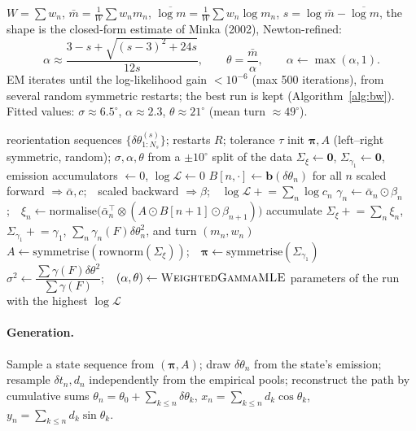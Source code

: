 \documentclass[11pt]{article}
\begin{document}
$W=\sum w_n$, $\bar m=\frac1W\sum w_nm_n$,
$\overline{\log m}=\frac1W\sum w_n\log m_n$, $s=\log\bar m-\overline{\log m}$, the
shape is the closed-form estimate of Minka (2002), Newton-refined:
\begin{equation}
\alpha\approx\frac{3-s+\sqrt{(s-3)^2+24s}}{12s},\qquad
\theta=\frac{\bar m}{\alpha},\qquad \alpha\leftarrow\max(\alpha,1).
\end{equation}
EM iterates until the log-likelihood gain $<10^{-6}$ (max 500 iterations), from
several random symmetric restarts; the best run is kept
(Algorithm~\ref{alg:bw}). Fitted values: $\sigma\approx6.5^\circ$,
$\alpha\approx2.3$, $\theta\approx21^\circ$ (mean turn $\approx49^\circ$).

\begin{algorithm}[h]
\caption{Baum-Welch for the symmetric 3-state HMM (spontaneous model)}
\label{alg:bw}
\begin{algorithmic}[1]
\Require reorientation sequences $\{\delta\theta^{(s)}_{1:N_s}\}$; restarts $R$; tolerance $\tau$
  \State init $\boldsymbol\pi,A$ (left--right symmetric, random); $\sigma,\alpha,\theta$ from a $\pm10^\circ$ split of the data
  \Repeat
    \State $\Sigma_\xi\gets\mathbf 0$, $\Sigma_{\gamma_1}\gets\mathbf 0$, emission accumulators $\gets 0$, $\log\mathcal L\gets 0$
      \State $B[n,\cdot]\gets\mathbf b(\delta\theta_n)$ for all $n$
      \State scaled forward $\Rightarrow\bar\alpha,c$;\ \ scaled backward $\Rightarrow\beta$;\ \ $\log\mathcal L\mathrel{+}=\sum_n\log c_n$
      \State $\gamma_n\gets\bar\alpha_n\odot\beta_n$;\ \ $\xi_n\gets\mathrm{normalise}\big(\bar\alpha_n^{\!\top}\!\otimes(A\odot B[n{+}1]\odot\beta_{n+1})\big)$
      \State accumulate $\Sigma_\xi\mathrel{+}=\sum_n\xi_n$, $\Sigma_{\gamma_1}\mathrel{+}=\gamma_1$, $\sum_n\gamma_n(F)\delta\theta_n^2$, and turn $(m_n,w_n)$
    \EndFor
    \State $A\gets\mathrm{symmetrise}(\mathrm{rownorm}(\Sigma_\xi))$;\ \ $\boldsymbol\pi\gets\mathrm{symmetrise}(\Sigma_{\gamma_1})$
    \State $\sigma^2\gets\dfrac{\sum\gamma(F)\delta\theta^2}{\sum\gamma(F)}$;\ \ $(\alpha,\theta)\gets\textsc{WeightedGammaMLE}$
\EndFor
\State \Return parameters of the run with the highest $\log\mathcal L$
\end{algorithmic}
\end{algorithm}

\paragraph{Generation.}
Sample a state sequence from $(\boldsymbol\pi,A)$; draw $\delta\theta_n$ from the
state's emission; resample $\delta t_n,d_n$ independently from the empirical
pools; reconstruct the path by cumulative sums
$\theta_n=\theta_0+\sum_{k\le n}\delta\theta_k$,
$x_n=\sum_{k\le n}d_k\cos\theta_k$, $y_n=\sum_{k\le n}d_k\sin\theta_k$.
\end{document}
